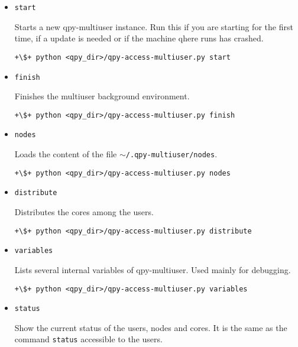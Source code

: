 \documentclass[a4paper,12pt]{article}
\begin{document}
\begin{itemize}

\item \texttt{start}
  
  Starts a new qpy-multiuser instance.
  Run this if you are starting \qpy{} for the first time, if a update is needed or if the machine qhere \qpy{} runs has crashed.
  
  \begin{lstlisting}[style=BashStyle]
+\$+ python <qpy_dir>/qpy-access-multiuser.py start
  \end{lstlisting}

\item \texttt{finish}
  
  Finishes the multiuser background environment.
  \begin{lstlisting}[style=BashStyle]
+\$+ python <qpy_dir>/qpy-access-multiuser.py finish
\end{lstlisting}


\item \texttt{nodes}

  Loads the content of the file \texttt{$\sim$/.qpy-multiuser/nodes}.

  \begin{lstlisting}[style=BashStyle]
+\$+ python <qpy_dir>/qpy-access-multiuser.py nodes
  \end{lstlisting}


\item \texttt{distribute}

  Distributes the cores among the users.

  \begin{lstlisting}[style=BashStyle]
+\$+ python <qpy_dir>/qpy-access-multiuser.py distribute
  \end{lstlisting}

  
\item \texttt{variables}

  Lists several internal variables of qpy-multiuser.
  Used mainly for debugging.

  \begin{lstlisting}[style=BashStyle]
+\$+ python <qpy_dir>/qpy-access-multiuser.py variables
  \end{lstlisting}


\item \texttt{status}

  Show the current status of the users, nodes and cores.
  It is the same as the command \texttt{status} accessible to the users.


\end{itemize}
\end{document}
